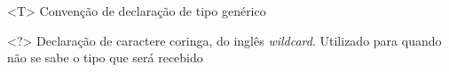 
\begin{simbolos}
    \item[<T>] Convenção de declaração de  tipo genérico
    \item[<?>] Declaração de caractere coringa, do inglês \textit{wildcard}. Utilizado para quando não se sabe o tipo que será recebido
\end{simbolos}